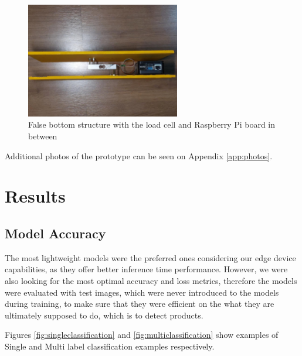 \documentclass[openright]{normas-utf-tex} %
\begin{document}
\begin{figure}[H]
	\centering
	\includegraphics[width=0.6\textwidth]{./images/cartbase2.jpeg}
	\caption[False bottom structure with the load cell and Raspberry Pi board in between]{False bottom structure with the load cell and Raspberry Pi board in between}
    \label{fig:falsebottom}
\end{figure}

Additional photos of the prototype can be seen on Appendix \ref{app:photos}.

\chapter{Results}

\section{Model Accuracy}

The most lightweight models were the preferred ones considering our edge device capabilities,
as they offer better inference time performance. 
However, we were also looking for the most optimal accuracy and loss metrics, 
therefore the models were evaluated with test images, which were never introduced to the models
during training, to make sure that they were efficient on the what they are ultimately supposed to do, 
which is to detect products.

Figures \ref{fig:singleclassification} and \ref{fig:multiclassification} show examples of 
Single and Multi label classification examples respectively.
\end{document}
